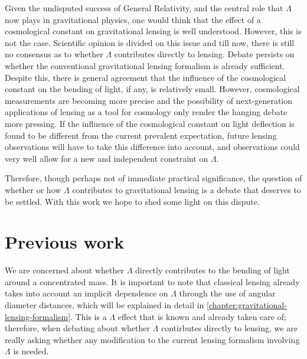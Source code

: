 Given the undisputed success of General Relativity, and the central role that $\Lambda$ now plays in gravitational physics, one would think that the effect of a cosmological constant on gravitational lensing is well understood. However, this is not the case. Scientific opinion is divided on this issue and till now, there is still no consensus as to whether $\Lambda$ contributes directly to lensing. Debate persists on whether the conventional gravitational lensing formalism is already sufficient. Despite this, there is general agreement that the influence of the cosmological constant on the bending of light, if any, is relatively small. However, cosmological measurements are becoming more precise and the possibility of next-generation applications of lensing as a tool for cosmology only render the hanging debate more pressing. If the influence of the cosmological constant on light deflection is found to be different from the current prevalent expectation, future lensing observations will have to take this difference into account, and observations could very well allow for a new and independent constraint on $\Lambda$. 

Therefore, though perhaps not of immediate practical significance, the question of whether or how $\Lambda$ contributes to gravitational lensing is a debate that deserves to be settled. With this work we hope to shed some light on this dispute. 



\section{Previous work}

We are concerned about whether $\Lambda$ directly contributes to the bending of light around a concentrated mass. It is important to note that classical lensing already takes into account an implicit dependence on $\Lambda$ through the use of angular diameter distances, which will be explained in detail in \autoref{chapter:gravitational-lensing-formalism}. This is a $\Lambda$ effect that is known and already taken care of; therefore, when debating about whether $\Lambda$ contirbutes directly to lensing, we are really asking whether any modification to the current lensing formalism involving $\Lambda$ is needed. 

